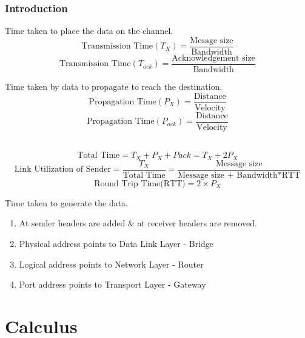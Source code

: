 \documentclass[a4paper,oneside]{book}
\begin{document}
\section{Introduction}
\begin{definition}
Time taken to place the data on the channel.
$$ \text{Transmission Time}(T_X) = \dfrac{\text{Mesage size}}{\text{Bandwidth}}$$
$$ \text{Transmission Time}(T_{ack}) = \dfrac{\text{Acknowledgement size}}{\text{Bandwidth}}$$
\end{definition}
\begin{definition}
Time taken by data to propagate to reach the destination.
$$ \text{Propagation Time}(P_X) = \dfrac{\text{Distance}}{\text{Velocity}} $$
$$ \text{Propagation Time}(P_{ack}) = \dfrac{\text{Distance}}{\text{Velocity}} $$\\
\end{definition}
$$ \text{Total Time} = T_{X} + P_X + P{ack} = T_X + 2P_X$$
$$ \text{Link Utilization of Sender} = \dfrac{T_X}{\text{Total Time}} = \dfrac{\text{Message size}}{\text{Message size + Bandwidth*RTT}}$$
$$ \text{Round Trip Time(RTT)} = 2 \times P_X $$
\begin{definition}
Time taken to generate the data.
\end{definition}
\begin{enumerate}
\item At sender headers are added \& at receiver headers are removed.
\item Physical address points to Data Link Layer - Bridge
\item Logical address points to Network Layer - Router
\item Port address points to Transport Layer - Gateway
\end{enumerate}




















\part{Calculus}
\end{document}
